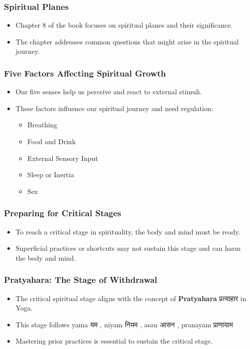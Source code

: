 \begin{frame}[fragile]\frametitle{Spiritual Planes}
    \begin{itemize}
        \item Chapter 8 of the book focuses on spiritual planes and their significance.
        \item The chapter addresses common questions that might arise in the spiritual journey.
    \end{itemize}
\end{frame}

\begin{frame}[fragile]\frametitle{Five Factors Affecting Spiritual Growth}
    \begin{itemize}
        \item Our five senses help us perceive and react to external stimuli.
        \item These factors influence our spiritual journey and need regulation:
            \begin{itemize}
                \item Breathing
                \item Food and Drink
                \item External Sensory Input
                \item Sleep or Inertia
                \item Sex
            \end{itemize}
    \end{itemize}
\end{frame}

\begin{frame}[fragile]\frametitle{Preparing for Critical Stages}
    \begin{itemize}
        \item To reach a critical stage in spirituality, the body and mind must be ready.
        \item Superficial practices or shortcuts may not sustain this stage and can harm the body and mind.
    \end{itemize}
\end{frame}

\begin{frame}[fragile]\frametitle{Pratyahara: The Stage of Withdrawal}
    \begin{itemize}
        \item The critical spiritual stage aligns with the concept of \textbf{Pratyahara} प्रत्याहार in Yoga.
        \item This stage follows yama यम  , niyam नियम , asan आसन , pranayam प्राणायाम 
        \item Mastering prior practices is essential to sustain the critical stage.
    \end{itemize}
\end{frame}

